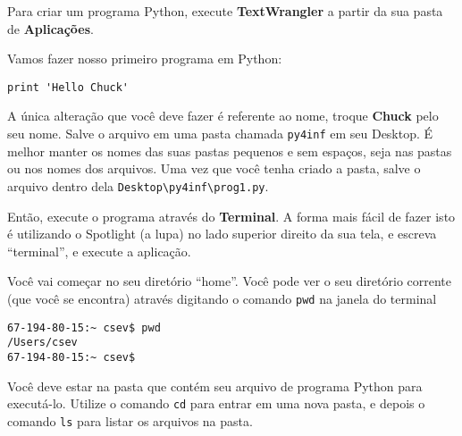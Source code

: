 Para criar um programa Python, execute {\bf TextWrangler} a partir da sua 
pasta de {\bf Aplicações}.


Vamos fazer nosso primeiro programa em Python:

\beforeverb
\begin{verbatim}
print 'Hello Chuck'
\end{verbatim}
\afterverb
%
%
A única alteração que você deve fazer é referente ao nome, troque {\bf Chuck} 
pelo seu nome. Salve o arquivo em uma pasta chamada {\tt py4inf} em seu 
Desktop. É melhor manter os nomes das suas pastas pequenos e sem espaços, 
seja nas pastas ou nos nomes dos arquivos. Uma vez que você tenha criado a 
pasta, salve o arquivo dentro dela {\tt Desktop{\textbackslash}py4inf{\textbackslash}prog1.py}.


Então, execute o programa através do {\bf Terminal}. A forma mais fácil de 
fazer isto é utilizando o Spotlight (a lupa) no lado superior direito da sua 
tela, e escreva ``terminal'', e execute a aplicação.


Você vai começar no seu diretório ``home''. Você pode ver o seu diretório 
corrente (que você se encontra) através digitando o comando {\tt pwd} na 
janela do terminal

\beforeverb
\begin{verbatim}
67-194-80-15:~ csev$ pwd
/Users/csev
67-194-80-15:~ csev$ 
\end{verbatim}
\afterverb
%
%
Você deve estar na pasta que contém seu arquivo de programa Python para 
executá-lo. Utilize o comando {\tt cd} para entrar em uma nova pasta, e 
depois o comando {\tt ls} para listar os arquivos na pasta.

